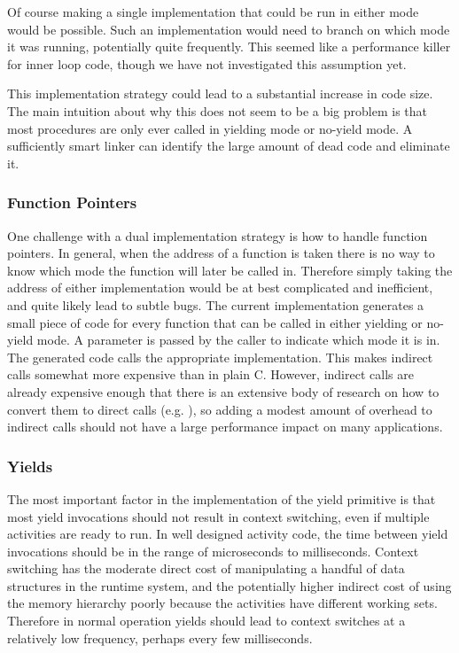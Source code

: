 \documentclass[pldi,10pt,preprint]{sigplanconf-pldi16}
\begin{document}
Of course making a single implementation that could be run in either mode would be possible.
Such an implementation would need to branch on which mode it was running, potentially quite frequently.
This seemed like a performance killer for inner loop code, though we have not investigated this assumption yet.

This implementation strategy could lead to a substantial increase in code size.
The main intuition about why this does not seem to be a big problem is that most procedures are only ever called in yielding mode or no-yield mode.
A sufficiently smart linker can identify the large amount of dead code and eliminate it.


\subsubsection{Function Pointers}

One challenge with a dual implementation strategy is how to handle function pointers.
In general, when the address of a function is taken there is no way to know which mode the function will later be called in.
Therefore simply taking the address of either implementation would be at best complicated and inefficient, and quite likely lead to subtle bugs.
The current implementation generates a small piece of code for every function that can be called in either yielding or no-yield mode.
A parameter is passed by the caller to indicate which mode it is in.
The generated code calls the appropriate implementation.
This makes indirect calls somewhat more expensive than in plain C.
However, indirect calls are already expensive enough that there is an extensive body of research on how to convert them to direct calls (e.g. \cite{Dean1995}), so adding a modest amount of overhead to indirect calls should not have a large performance impact on many applications.

\subsubsection{Yields}

The most important factor in the implementation of the yield primitive is that most yield invocations should not result in context switching, even if multiple activities are ready to run.
In well designed activity code, the time between yield invocations should be in the range of microseconds to milliseconds.
Context switching has the moderate direct cost of manipulating a handful of data structures in the runtime system, and the potentially higher indirect cost of using the memory hierarchy poorly because the activities have different working sets.
Therefore in normal operation yields should lead to context switches at a relatively low frequency, perhaps every few milliseconds.
\end{document}
